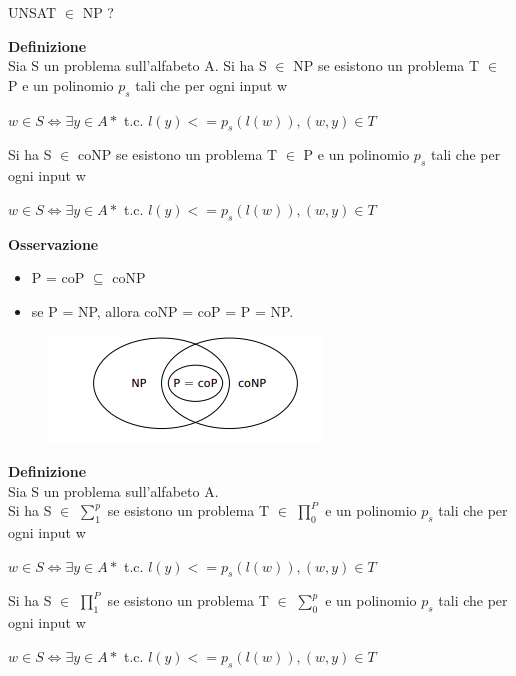 \begin{center}
    UNSAT $\in$ NP ?
\end{center}
\textbf{Definizione}\\
Sia S un problema sull’alfabeto A.
Si ha S $\in$ NP se esistono un problema T $\in$ P e un polinomio $p_s$ tali che per ogni input w
\begin{center}
    $w \in S \Longleftrightarrow \exists y \in A*$ t.c. $l(y) <= p_s (l(w)), (w, y) \in T$
\end{center}
Si ha S $\in$ coNP se esistono un problema T $\in$ P e un polinomio $p_s$ tali che per ogni input w
\begin{center}
     $w \in S \Longleftrightarrow \exists y \in A*$ t.c. $l(y) <= p_s (l(w)), (w, y) \in T$
\end{center}
\textbf{Osservazione}\\
\begin{itemize}
    \item P = coP $\subseteq$ coNP
    
    \item se P = NP, allora coNP = coP = P = NP.
\end{itemize}
\newpage
\begin{figure}[htp]
    \centering
    \includegraphics[scale=0.9]{tesi_stile/img/foto6cap15.png}
\end{figure}
\textbf{Definizione}\\
Sia S un problema sull’alfabeto A.\\
Si ha S $\in$ $\sum_{1}^p$ se esistono un problema T $\in$ $\prod_{0}^{P}$ e un polinomio $p_s$ tali che per ogni input w
\begin{center}
      $w \in S \Longleftrightarrow \exists y \in A*$ t.c. $l(y) <= p_s (l(w)), (w, y) \in T$
\end{center}
Si ha S $\in$  $\prod_{1}^{P}$ se esistono un problema T $\in$ $\sum_{0}^p$ e un polinomio $p_s$ tali che per ogni input w
\begin{center}
      $w \in S \Longleftrightarrow \exists y \in A*$ t.c. $l(y) <= p_s (l(w)), (w, y) \in T$
\end{center}
\newpage
